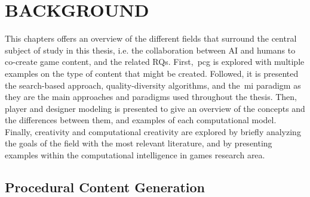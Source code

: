 \section{BACKGROUND} \normalfont \label{background}

This chapters offers an overview of the different fields that surround the central subject of study in this thesis, i.e. the collaboration between AI and humans to co-create game content, and the related RQs. First,~\acrlong{pcg} is explored with multiple examples on the type of content that might be created. Followed, it is presented the search-based approach, quality-diversity algorithms, and the~\acrlong{mi} paradigm as they are the main approaches and paradigms used throughout the thesis. Then, player and designer modeling is presented to give an overview of the concepts and the differences between them, and examples of each computational model. Finally, creativity and computational creativity are explored by briefly analyzing the goals of the field with the most relevant literature, and by presenting examples within the computational intelligence in games research area.





\subsection{Procedural Content Generation}


